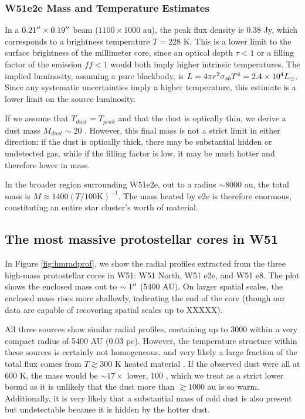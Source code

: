 \documentclass{aa}
\begin{document}
\subsubsection{W51e2e Mass and Temperature Estimates}
\label{sec:W51e2e}

In a $0.21\mbox{$^{\prime\prime}$}\times0.19\mbox{$^{\prime\prime}$}$ beam ($1100\times1000$ au), the peak flux
density is 0.38 Jy, which corresponds to a brightness temperature $T=228$ K.
This is a lower limit to the surface brightness of the millimeter core, since
an optical depth $\tau<1$ or a filling factor of the emission $ff<1$ would both
imply higher intrinsic temperatures.  The implied luminosity, assuming a pure
blackbody, is $L = 4\pi r^2 \sigma_{sb} T^4 = 2.4\times10^{4} L_{\odot}$.  Since any systematic
uncertainties imply a higher temperature, this estimate is a lower limit on the source
luminosity.

If we assume that $T_{dust} = T_{peak}$ and that the dust is optically thin, we
derive a dust mass $M_{dust}\sim20$ \msun.  However, this final mass is not a
strict limit in either direction: if the dust is optically thick, there may be
substantial hidden or undetected gas, while if the filling factor is low, it
may be much hotter and therefore lower in mass.

In the broader region surrounding W51e2e, out to a radius $\sim8000$ au,
the total mass is $M\approx1400 (T / 100 \mathrm{K})^{-1}$.  The mass
heated by e2e is therefore enormous, constituting an entire star cluster's
worth of material.

\subsection{The most massive protostellar cores in W51}
In Figure \ref{fig:hmradprof}, we show the radial profiles extracted from the
three high-mass protostellar cores in W51: W51 North, W51 e2e, and W51 e8.
The plot shows the enclosed mass out to $\sim1\mbox{$^{\prime\prime}$}$ (5400 AU).  On larger
spatial scales, the enclosed mass rises more shallowly, indicating the end of the
core (though our data are capable of recovering spatial scales up to XXXXX).

All three sources show similar radial profiles, containing up to 3000 \msun
within a very compact radius of 5400 AU (0.03 pc).  However, the temperature
structure within these sources is certainly not homogeneous, and very likely a
large fraction of the total flux comes from $T\gtrsim300$ K heated material
\citep[Section \ref{sec:temperature}][]{Goddi2016a}.  If the observed dust were
all at 600 K, the mass would be $\sim17\times$ lower, 100 \msun, which we treat
as a strict lower bound as it is unlikely that the dust more than $\gtrsim1000$
au is so warm.  Additionally, it is very likely that a substantial mass of cold
dust is also present but undetectable because it is hidden by the hotter dust.
\end{document}
